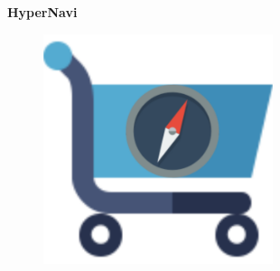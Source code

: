 \documentclass[11pt,slides,aspectratio=43]{beamer}%
\begin{document}
    \begin{frame}
         \center\Huge\textbf{HyperNavi}
         \begin{figure}[t!]
            \begin{center}
                \includegraphics[width =0.6\textwidth]{logo.png}

            \end{center}
       \end{figure}

    \end{frame}
\end{document}
